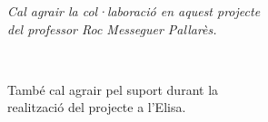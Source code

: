 \cleardoublepage

{}
\nocite{*}



\cleardoublepage

\setlength{\descriptionwidth}{0.8\linewidth}
\printglossary

\cleardoublepage
\pagestyle{empty}
\vspace*{5cm}
\begin{flushright}
\it
Cal agrair la col·laboració en aquest projecte \\
del professor Roc Messeguer Pallarès.

\

També cal agrair pel suport durant la \\
realització del projecte a l'Elisa.
\end{flushright}
\cleardoublepage
